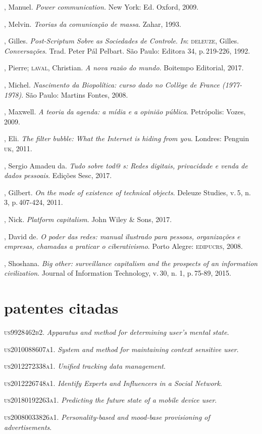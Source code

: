 \begin{bibliohedra}
, Manuel. \emph{Power communication.} New York: Ed. Oxford,
2009.

, Melvin. \emph{Teorias da comunicação de massa}. Zahar, 1993.

, Gilles. \emph{Post-Scriptum Sobre as Sociedades de Controle}. \emph{In}:
\textsc{deleuze}, Gilles. \emph{Conversações}. Trad. Peter Pál Pelbart. São Paulo:
Editora 34, p.\,219-226, 1992.

, Pierre; \textsc{laval}, Christian. \emph{A nova razão do mundo}.
Boitempo Editorial, 2017.

, Michel. \emph{Nascimento da Biopolítica: curso dado no
Collège de France (1977-1978)}. São Paulo: Martins Fontes, 2008.

, Maxwell. \emph{A teoria da agenda: a mídia e a opinião
pública}. Petrópolis: Vozes, 2009.

, Eli. \emph{The filter bubble: What the Internet is hiding
from you}. Londres: Penguin \textsc{uk}, 2011.

, Sergio Amadeu da. \emph{Tudo sobre tod@ s: Redes digitais,
privacidade e venda de dados pessoais}. Edições Sesc, 2017.

, Gilbert. \emph{On the mode of existence of technical
objects}. Deleuze Studies, v.\,5, n. 3, p.\,407-424, 2011.

, Nick. \emph{Platform capitalism}. John Wiley \& Sons, 2017.

, David de. \emph{O poder das redes: manual ilustrado para
pessoas, organizações e empresas, chamadas a praticar o ciberativismo}.
Porto Alegre: \textsc{edipucrs}, 2008.

, Shoshana. \emph{Big other: surveillance capitalism and the
prospects of an information civilization}. Journal of Information
Technology, v.\,30, n. 1, p.\,75-89, 2015.

\section{patentes citadas}
\tit\textsc{us9928462b2}. \textit{Apparatus and method for determining user's mental state}.

\tit\textsc{us2010088607a1}. \textit{System and method for maintaining context sensitive user}.

\tit\textsc{us2012272338a1}. \textit{Unified tracking data management}.

\tit\textsc{us2012226748a1}. \textit{Identify Experts and Influencers in a Social Network}.

\tit\textsc{us20180192263a1}. \textit{Predicting the future state of a mobile device user}.

\tit\textsc{us20080033826a1}. \textit{Personality-based and mood-base provisioning of advertisements}.
\end{bibliohedra}

